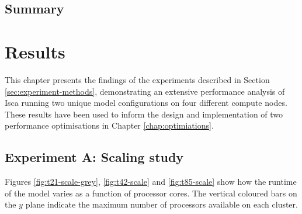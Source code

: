 \documentclass[a4paper,11pt]{report}
\begin{document}
\section{Summary}



\chapter{Results}
\label{chap:results}
This chapter presents the findings of the experiments described in Section \ref{sec:experiment-methods}, demonstrating an extensive performance analysis of Isca running two unique model configurations on four different compute nodes. These results have been used to inform the design and implementation of two performance optimisations in Chapter \ref{chap:optimiations}. 
\section{Experiment A: Scaling study} 
Figures \ref{fig:t21-scale-grey}, \ref{fig:t42-scale} and \ref{fig:t85-scale} show how the runtime of the model varies as a function of processor cores. The vertical coloured bars on the $y$ plane indicate the maximum number of processors available on each cluster.
\end{document}
